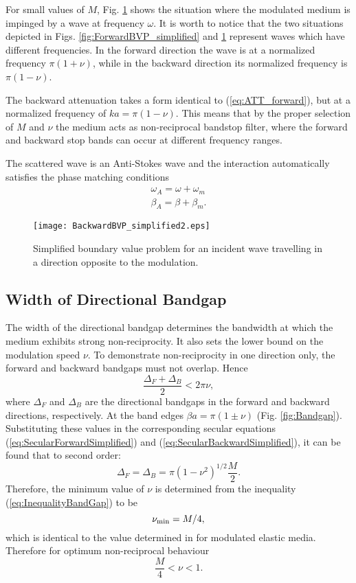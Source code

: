 \documentclass[journal]{IEEEtran}
\begin{document}
For small values of $M$, Fig. \ref{fig:BackwardBVP_simplified} shows the situation where the modulated medium is impinged by a wave at frequency $\omega$. It is worth to notice that the two situations depicted in Figs. \ref{fig:ForwardBVP_simplified} and \ref{fig:BackwardBVP_simplified} represent waves which have different frequencies. In the forward direction the wave is at a normalized frequency $\pi(1+\nu)$, while in the backward direction its normalized frequency is $\pi (1-\nu)$. 

The backward attenuation takes a form identical to (\ref{eq:ATT_forward}), but at a normalized frequency of $ka=\pi(1-\nu)$. This means that by the proper selection of $M$ and $\nu$ the medium acts as non-reciprocal bandstop filter, where the forward and backward stop bands can occur at different frequency ranges.

The scattered wave is an Anti-Stokes wave and the interaction automatically satisfies the phase matching conditions
\begin{eqnarray}
\label{eq:PMbackward}
\omega_A=\omega+\omega_m\\
\beta_A=\beta+\beta_m.
\end{eqnarray}
\begin{figure}
\centering
\texttt{[image: BackwardBVP\_simplified2.eps]}
\caption{Simplified boundary value problem for an incident wave travelling in a direction opposite to the modulation.}
\label{fig:BackwardBVP_simplified}
\end{figure}

\subsection{Width of Directional Bandgap}
The width of the directional bandgap determines the bandwidth at which the medium exhibits strong non-reciprocity. It also sets the lower bound on the modulation speed $\nu$. To demonstrate non-reciprocity in one direction only, the forward and backward bandgaps must not overlap. Hence
\begin{equation}
\label{eq:InequalityBandGap}
\frac{\Delta_F+\Delta_B}{2}<2\pi\nu,
\end{equation}
where $\Delta_F$ and $\Delta_B$ are the directional bandgaps in the forward and backward directions, respectively. At the band edges $\beta a=\pi(1\pm\nu)$ (Fig. \ref{fig:Bandgap}). Substituting these values in the corresponding secular equations (\ref{eq:SecularForwardSimplified}) and (\ref{eq:SecularBackwardSimplified}), it can be found that to second order:
\begin{equation}
\Delta_F=\Delta_B=\pi\left(1-\nu^2\right)^{1/2}\frac{M}{2}.
\end{equation}
Therefore, the minimum value of $\nu$ is determined from the inequality (\ref{eq:InequalityBandGap}) to be
\begin{equation}
\nu_{\textnormal{min}}=M/4,
\end{equation}
which is identical to the value determined in \cite{Trainiti2016} for modulated elastic media. Therefore for optimum non-reciprocal behaviour
\begin{equation}
\frac{M}{4}<\nu<1.
\end{equation}
 
\end{document}
